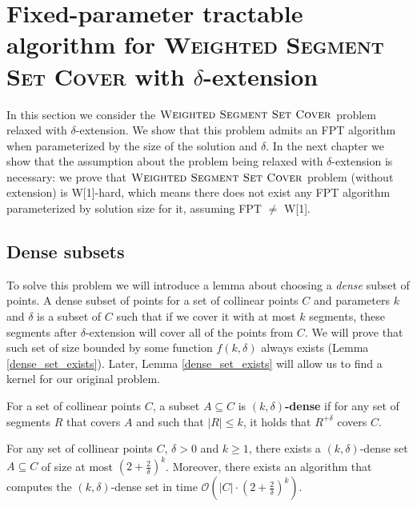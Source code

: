 \section{Fixed-parameter tractable algorithm for
\textsc{Weighted} \textsc{Segment} \textsc{Set} \textsc{Cover} with $\delta$-extension}
\label{section:fpt_weighted}

In this section we consider the $\textsc{Weighted Segment Set Cover}$ problem
relaxed with $\delta$-extension.
We show that this problem
admits an FPT algorithm when parameterized by the size
of the solution and $\delta$.
In the next chapter we show that the assumption
about the problem being relaxed with $\delta$-extension is necessary:
we prove that $\textsc{Weighted Segment Set Cover}$ problem
(without extension) is W[1]-hard, which means
there does not exist any FPT algorithm parameterized by solution size for it,
assuming FPT $\neq$ W[1].

\fptWeightedSegment*

\subsection{Dense subsets}

To solve this problem we will introduce a lemma about choosing
a \textit{dense} subset of points. A dense subset of points
for a set of collinear points $C$ and parameters $k$ and $\delta$
is a subset of $C$ such that
if we cover it with at most $k$ segments,
these segments after $\delta$-extension will cover all of the points from $C$.
We will prove that such set 
of size bounded by some function $f(k, \delta)$
always exists (Lemma \ref{dense_set_exists}).
Later, Lemma \ref{dense_set_exists} will allow us to find a kernel
for our original problem.

\begin{defi}
	For a set of collinear points $C$,
	a subset $A \subseteq C$ is \textbf{$(k,\delta)$-dense} 
	if for any set of segments $R$ that covers $A$ and
	such that $|R| \le k$, it holds that $R^{+\delta}$ covers $C$.
\end{defi}

\begin{lemma}
	\label{dense_set_exists}
	For any set of collinear points $C$, $\delta > 0$ and $k \ge 1$,
	there exists a $(k,\delta)$-dense set $A \subseteq C$ of size
	at most $(2+\frac{2}{\delta})^k$.
	Moreover, there exists an algorithm that computes the $(k,\delta)$-dense set
	in time $\mathcal{O}(|C| \cdot (2+\frac{2}{\delta})^k)$.
\end{lemma}

